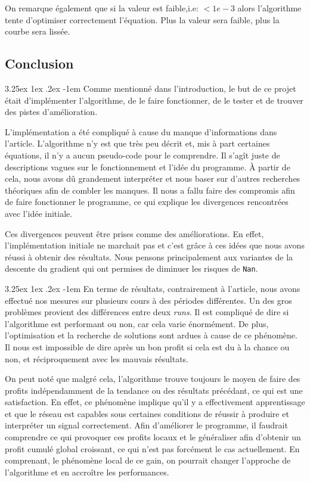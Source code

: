 \documentclass[a4paper, 11pt]{article}
\makeatletter
\renewcommand\paragraph{\@startsection{paragraph}{5}{\z@}%
  {3.25ex \@plus1ex \@minus.2ex}%
  {-1em}%
  {\normalfont\normalsize\bfseries}}
\makeatother
\begin{document}
 On remarque également que si la valeur est faible,i.e: $< 1e-3$ alors l'algorithme tente d'optimiser correctement l'équation. Plus la valeur sera faible,
 plus la courbe sera lissée.

 
\subsection{Conclusion}
\paragraph{}
Comme mentionné dans l'introduction, le but de ce projet était d'implémenter l'algorithme, de le faire fonctionner, de le tester et de trouver des pistes
d'amélioration.

L'implémentation a été compliqué à cause du manque d'informations dans l'article. L'algorithme n'y est que très peu décrit et, mis à part certaines 
équations, il n'y a aucun pseudo-code pour le comprendre. Il s'agît juste de descriptions vagues sur le fonctionnement et l'idée du programme. À partir de
cela, nous avons dû grandement interpréter et nous baser sur d'autres recherches théoriques afin de combler les manques. Il nous a fallu faire des compromis
afin de faire fonctionner le programme, ce qui explique les divergences rencontrées avec l'idée initiale.

Ces divergences peuvent être prises comme des améliorations. En effet, l'implémentation initiale ne marchait pas et c'est grâce à ces idées que nous avons
réussi à obtenir des résultats. Nous pensons principalement aux variantes de la descente du gradient qui ont permises de diminuer les risques de
\texttt{Nan}.

\paragraph{}
En terme de résultats, contrairement à l'article, nous avons effectué nos mesures sur plusieurs cours à des périodes différentes. Un des gros problèmes
provient des différences entre deux \textit{runs}. Il est compliqué de dire si l'algorithme est performant ou non, car cela varie énormément. De plus,
l'optimisation et la recherche de solutions sont ardues à cause de ce phénomène. Il nous est impossible de dire après un bon profit si cela est du à la
chance ou non, et réciproquement avec les mauvais résultats.

On peut noté que malgré cela, l'algorithme trouve toujours le moyen de faire des profits indépendamment de la tendance ou des résultats précédant, ce
qui est une satisfaction. En effet, ce phénomène implique qu'il y a effectivement apprentissage et que le réseau est capables sous certaines conditions
de réussir à produire et interpréter un signal correctement. Afin
d'améliorer le programme, il faudrait comprendre ce qui provoquer ces profits locaux et le généraliser afin d'obtenir un profit cumulé global croissant, ce qui
n'est pas forcément le cas actuellement. En comprenant, le phénomène local de ce gain, on pourrait changer l'approche de l'algorithme et en accroître les
performances.
\end{document}
